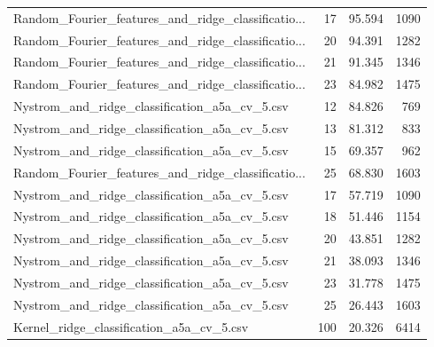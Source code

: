 \begin{tabularx}{\textwidth}{lrrr}
Random\_Fourier\_features\_and\_ridge\_classificatio... &       17 &   95.594 &          1090 \\
Random\_Fourier\_features\_and\_ridge\_classificatio... &       20 &   94.391 &          1282 \\
Random\_Fourier\_features\_and\_ridge\_classificatio... &       21 &   91.345 &          1346 \\
Random\_Fourier\_features\_and\_ridge\_classificatio... &       23 &   84.982 &          1475 \\
     Nystrom\_and\_ridge\_classification\_a5a\_cv\_5.csv &       12 &   84.826 &           769 \\
     Nystrom\_and\_ridge\_classification\_a5a\_cv\_5.csv &       13 &   81.312 &           833 \\
     Nystrom\_and\_ridge\_classification\_a5a\_cv\_5.csv &       15 &   69.357 &           962 \\
Random\_Fourier\_features\_and\_ridge\_classificatio... &       25 &   68.830 &          1603 \\
     Nystrom\_and\_ridge\_classification\_a5a\_cv\_5.csv &       17 &   57.719 &          1090 \\
     Nystrom\_and\_ridge\_classification\_a5a\_cv\_5.csv &       18 &   51.446 &          1154 \\
     Nystrom\_and\_ridge\_classification\_a5a\_cv\_5.csv &       20 &   43.851 &          1282 \\
     Nystrom\_and\_ridge\_classification\_a5a\_cv\_5.csv &       21 &   38.093 &          1346 \\
     Nystrom\_and\_ridge\_classification\_a5a\_cv\_5.csv &       23 &   31.778 &          1475 \\
     Nystrom\_and\_ridge\_classification\_a5a\_cv\_5.csv &       25 &   26.443 &          1603 \\
          Kernel\_ridge\_classification\_a5a\_cv\_5.csv &      100 &   20.326 &          6414 \\
\bottomrule
\end{tabularx}
